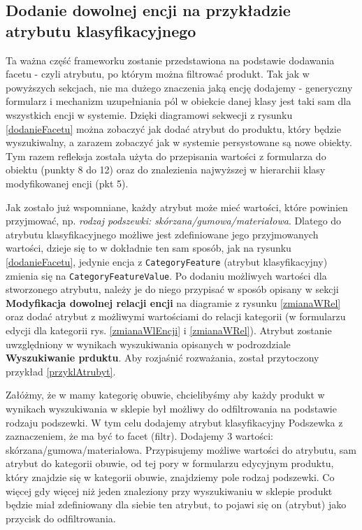\subsection{Dodanie dowolnej encji na przykładzie atrybutu klasyfikacyjnego}
Ta ważna część frameworku zostanie przedstawiona na podstawie dodawania facetu - czyli atrybutu, po którym można filtrować produkt. Tak jak w powyższych sekcjach, nie ma dużego znaczenia jaką encję dodajemy - generyczny formularz i mechanizm uzupełniania pól w obiekcie danej klasy jest taki sam dla wszystkich encji w systemie. Dzięki diagramowi sekwecji z rysunku \ref{dodanieFacetu} można zobaczyć jak dodać atrybut do produktu, który będzie wyszukiwalny, a zarazem zobaczyć jak w systemie persystowane są nowe obiekty. Tym razem refleksja została użyta do przepisania wartości z formularza do obiektu (punkty 8 do 12) oraz do znalezienia najwyższej w hierarchii klasy modyfikowanej encji (pkt 5). 

Jak zostało już wspomniane, każdy atrybut może mieć wartości, które powinien przyjmować, np. \textit{rodzaj podszewki: skórzana/gumowa/materiałowa}. Dlatego do atrybutu klasyfikacyjnego możliwe jest zdefiniowane jego przyjmowanych wartości, dzieje się to w dokładnie ten sam sposób, jak na rysunku \ref{dodanieFacetu}, jedynie encja z \texttt{CategoryFeature} (atrybut klasyfikacyjny) zmienia się na \texttt{CategoryFeatureValue}. Po dodaniu możliwych wartości dla stworzonego atrybutu, należy je do niego przypisać w sposób opisany w sekcji \textbf{Modyfikacja dowolnej relacji encji} na diagramie z rysunku \ref{zmianaWRel} oraz dodać atrybut z możliwymi wartościami do relacji kategorii (w formularzu edycji dla kategorii rys. \ref{zmianaWlEncji} i \ref{zmianaWRel}). Atrybut zostanie uwzględniony w wynikach wyszukiwania opisanych w podrozdziale \textbf{Wyszukiwanie prduktu}. Aby rozjaśnić rozważania, został przytoczony przykład \ref{przyklAtrubyt}.
\begin{example} 
	Załóżmy, że w mamy kategorię obuwie, chcielibyśmy aby każdy produkt w wynikach wyszukiwania w sklepie był możliwy do odfiltrowania na podstawie rodzaju podszewki. W tym celu dodajemy atrybut klasyfikacyjny Podszewka z zaznaczeniem, że ma być to facet (filtr). Dodajemy 3 wartości: skórzana/gumowa/materiałowa. Przypisujemy możliwe wartości do atrybutu, sam atrybut do kategorii obuwie, od tej pory w formularzu edycyjnym produktu, który znajdzie się w kategorii obuwie, znajdziemy pole rodzaj podszewki. Co więcej gdy więcej niż jeden znaleziony przy wyszukiwaniu w sklepie produkt będzie miał zdefiniowany dla siebie ten atrybut, to pojawi się on (atrybut) jako przycisk do odfiltrowania.  
	\label{przyklAtrubyt}
\end{example}
 
